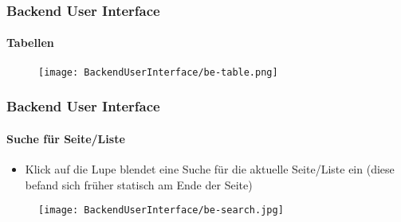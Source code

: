 
\begin{frame}[fragile]
	\frametitle{Backend User Interface}
	\framesubtitle{Tabellen}

	\begin{figure}
		\texttt{[image: BackendUserInterface/be-table.png]}
	\end{figure}

\end{frame}


\begin{frame}[fragile]
	\frametitle{Backend User Interface}
	\framesubtitle{Suche für Seite/Liste}

	\begin{itemize}
		\item Klick auf die Lupe blendet eine Suche für die aktuelle Seite/Liste ein\newline
			(diese befand sich früher statisch am Ende der Seite)
	\end{itemize}

	\begin{figure}
		\texttt{[image: BackendUserInterface/be-search.jpg]}
	\end{figure}

\end{frame}


